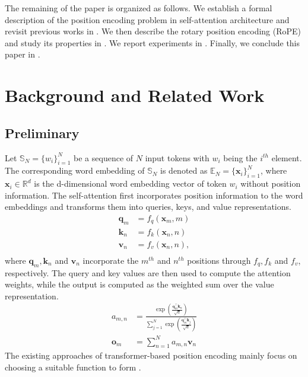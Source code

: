 \documentclass{article}
\def\q{{\boldsymbol q}}
\def\k{{\boldsymbol k}}
\def\v{{\boldsymbol v}}
\def\x{{\boldsymbol x}}
\begin{document}
The remaining of the paper is organized as follows. We establish a formal description of the position encoding problem in self-attention architecture and revisit previous works in . We then describe the rotary position encoding (RoPE) and study its properties in . We report experiments in . Finally, we conclude this paper in .

\section{Background and Related Work}\label{sec:background}
\subsection{Preliminary}
Let $\mathbb{S}_N=\{w_i\}_{i=1}^{N}$ be a sequence of $N$ input tokens with $w_i$ being the $i^{th}$ element. The corresponding word embedding of $\mathbb{S}_N$ is denoted as $\mathbb{E}_N = \{\x_i\}_{i=1}^{N}$, where $\x_i\in \mathbb{R}^{d}$ is the d-dimensional word embedding vector of token $w_i$ without position information. The self-attention first incorporates position information to the word embeddings and transforms them into queries, keys, and value representations. 
\begin{equation}
	\begin{aligned}
		\q_m &=f_q(\x_m, m)\\
		\k_n &=f_k(\x_n, n)\\
		\v_n &=f_v(\x_n, n),\\
	\end{aligned}
	\label{fn:qkv}
\end{equation}
where $\q_m,\k_n$ and $ \v_n$ incorporate the $m^{th}$ and $n^{th}$ positions through $f_q,f_k$ and $f_v$, respectively. The query and key values are then used to compute the attention weights, while  the output is computed as the weighted sum over the value representation. 
\begin{equation}
	\begin{aligned}
		a_{m,n}&=\frac{\exp(\frac{\q_m^{\intercal}\k_n}{\sqrt{d}})}{\sum_{j=1}^{N}\exp(\frac{\q_m^{\intercal}\k_j}{\sqrt{d}})}\\
		\mathbf{o}_m&=\sum_{n=1}^{N}a_{m,n}\v_{n}
	\end{aligned}
	\label{fn:attn}
\end{equation}
The existing approaches of transformer-based position encoding mainly focus on choosing a suitable function to form .
\end{document}
